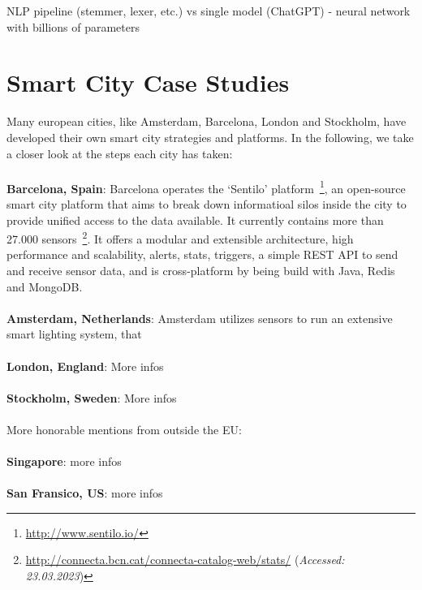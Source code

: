 NLP pipeline (stemmer, lexer, etc.)
vs single model (ChatGPT) - neural network with billions of parameters

\section{Smart City Case Studies}
\label{sec: smart city case studies}

Many european cities, like Amsterdam, Barcelona, London and Stockholm, have developed their own smart city strategies and platforms. In the following, we take a closer look at the steps each city has taken:\\
\\
\textbf{Barcelona, Spain}: Barcelona operates the `Sentilo' platform~\footnote{\url{http://www.sentilo.io/}}, an open-source smart city platform that aims to break down informatioal silos inside the city to provide unified access to the data available. It currently contains more than 27.000 sensors~\footnote{\url{http://connecta.bcn.cat/connecta-catalog-web/stats/} (\textit{Accessed: 23.03.2023})}. It offers a modular and extensible architecture, high performance and scalability, alerts, stats, triggers, a simple REST API to send and receive sensor data, and is cross-platform by being build with Java, Redis and MongoDB.\\
\\
\textbf{Amsterdam, Netherlands}: Amsterdam utilizes sensors to run an extensive smart lighting system, that\\
\\
\textbf{London, England}: More infos\\
\\
\textbf{Stockholm, Sweden}: More infos\\
\\
More honorable mentions from outside the EU:\\
\\
\textbf{Singapore}: more infos\\
\\
\textbf{San Fransico, US}: more infos\\
